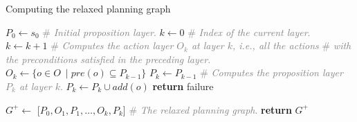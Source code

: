 \documentclass[ppgc,diss,english]{iiufrgs}
\begin{document}
\begin{algorithm}[tb]
\caption{Computing the relaxed planning graph}
\label{alg:computing-rpg}
\begin{algorithmic}[1]
  \State $P_{0} \gets s_{0}$ \textcolor{gray}{\# \emph{Initial proposition layer}.}
  \State $k \gets 0$ \textcolor{gray}{\# \emph{Index of the current layer}.}
    \State $k \gets k + 1$
    \State \textcolor{gray}{\# \emph{Computes the action layer $O_{k}$ at layer $k$, i.e., all the actions}}
    \State \textcolor{gray}{\# \emph{with the preconditions satisfied in the preceding layer}.}
    \State $O_{k} \gets \{o \in O\ \mid pre(o) \subseteq P_{k-1}\}$
    \State $P_{k} \gets P_{k-1}$
      \State \textcolor{gray}{\# \emph{Computes the proposition layer $P_{k}$ at layer $k$}.}
      \State $P_{k} \gets P_{k} \cup add(o)$
    \EndFor
      \State \textbf{return} failure
    \EndIf

  \EndWhile

  \State $G^{+} \gets $ [$P_{0}, O_{1}, P_{1},\ldots,O_{k}, P_{k}$] \textcolor{gray}{\# \emph{The relaxed planning graph}.}
  \State \textbf{return} $G^{+}$
\EndProcedure
\end{algorithmic}
\end{algorithm}
\end{document}

